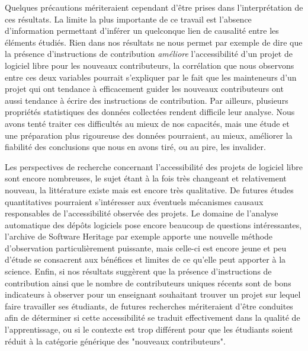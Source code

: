 Quelques précautions mériteraient cependant d'être prises dans l'interprétation de ces résultats. La limite la
plus importante de ce travail est l'absence d'information permettant d'inférer un quelconque lien de causalité
entre les éléments étudiés. Rien dans nos résultats ne nous permet par exemple de dire que la présence
d'instructions de contribution \emph{améliore} l'accessibilité d'un projet de logiciel libre pour les nouveaux
contributeurs, la corrélation que nous observons entre ces deux variables pourrait s'expliquer par le fait que
les mainteneurs d'un projet qui ont tendance à efficacement guider les nouveaux contributeurs ont aussi
tendance à écrire des instructions de contribution. Par ailleurs, plusieurs propriétés statistiques des
données collectées rendent difficile leur analyse. Nous avons tenté traiter ces difficultés au mieux de nos
capacités, mais une étude et une préparation plus rigoureuse des données pourraient, au mieux, améliorer la
fiabilité des conclusions que nous en avons tiré, ou au pire, les invalider.

Les perspectives de recherche concernant l'accessibilité des projets de logiciel libre sont encore nombreuses,
le sujet étant à la fois très changeant et relativement nouveau, la littérature existe mais est encore très
qualitative. De futures études quantitatives pourraient s'intéresser aux éventuels mécanismes causaux
responsables de l'accessibilité observée des projets. Le domaine de l'analyse automatique des dépôts logiciels
pose encore beaucoup de questions intéressantes, l'archive de Software Heritage par exemple apporte une
nouvelle méthode d'observation particulièrement puissante, mais celle-ci est encore jeune et peu d'étude se
consacrent aux bénéfices et limites de ce qu'elle peut apporter à la science. Enfin, si nos résultats
suggèrent que la présence d'instructions de contribution ainsi que le nombre de contributeurs uniques récents
sont de bons indicateurs à observer pour un enseignant souhaitant trouver un projet sur lequel faire
travailler ses étudiants, de futures recherches mériteraient d'être conduites afin de déterminer si cette
accessibilité se traduit effectivement dans la qualité de l'apprentissage, ou si le contexte est trop
différent pour que les étudiants soient réduit à la catégorie générique des "nouveaux contributeurs".
